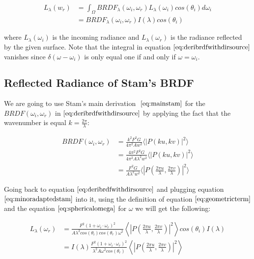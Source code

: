 \begin{align}
L_{\lambda}(w_r) 
& = \int_{\Omega} BRDF_{\lambda}(\omega_i, \omega_r) L_{\lambda}(\omega_i) cos(\theta_i) d\omega_i \nonumber \\
& = BRDF_{\lambda}(\omega_i, \omega_r) I(\lambda) cos(\theta_i)
\label{eq:deribrdfwithdirsource}
\end{align}

where $L_{\lambda}(\omega_i)$ is the incoming radiance and $L_{\lambda}(\omega_r)$ is the radiance reflected by the given surface. Note that the integral in equation $\ref{eq:deribrdfwithdirsource}$ vanishes since $\delta(\omega-\omega_i)$ is only equal one if and only if $\omega = \omega_i$.

\subsection{Reflected Radiance of Stam's BRDF}
We are going to use Stam's main derivation $~\eqref{eq:mainstam}$ for the $BRDF(\omega_i, \omega_r)$ in $\ref{eq:deribrdfwithdirsource}$ by applying the fact that the wavenumber is equal $k=\frac{2\pi}{\lambda}$:

\begin{align}
BRDF(\omega_i, \omega_r) 
& = \frac{k^2 F^2 G}{4\pi^2 A w^2} \langle \left|P(ku, kv) \right|^2\rangle \nonumber\\
& = \frac{4 \pi^2 F^2 G}{4\pi^2 A \lambda^2 w^2} \langle \left|P(ku, kv)  \right|^2\rangle \nonumber\\
& = \frac{F^2 G}{A \lambda^2 w^2} \langle \left|P(\frac{2\pi u}{\lambda}, \frac{2\pi v}{\lambda})  \right|^2\rangle
\label{eq:minoradaptedstam}
\end{align}

Going back to equation $\ref{eq:deribrdfwithdirsource}$ and plugging equation $\ref{eq:minoradaptedstam}$ into it, using the definition of equation $\ref{eq:geometricterm}$ and the equation $\ref{eq:sphericalomega}$ for $\omega$ we will get the following:

\begin{align}
L_{\lambda}(\omega_r) 
& = \frac{F^2 (1 + \omega_i \cdot \omega_r)^2}{A \lambda^2 cos(\theta_i)cos(\theta_r)  \omega^2} \left \langle \left|P \left( \frac{2\pi u}{\lambda}, \frac{2\pi v}{\lambda}\right) \right|^2 \right \rangle cos(\theta_i) I(\lambda) \nonumber \\
& = I(\lambda) \frac{F^2 (1 + \omega_i \cdot \omega_r)^2}{\lambda^2 A \omega^2 cos(\theta_r)} \left \langle \left|P \left( \frac{2\pi u}{\lambda}, \frac{2\pi v}{\lambda}\right) \right|^2 \right \rangle
\label{eq:nonrelativebrdffinding}
\end{align}


